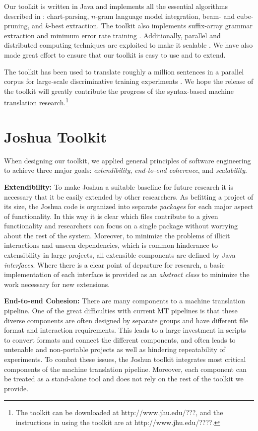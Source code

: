 \documentclass[11pt]{article}
\begin{document}
Our toolkit is written in Java and implements all the essential algorithms described in : chart-parsing, $n$-gram language model integration, beam- and cube-pruning, and $k$-best extraction.  The toolkit also implements suffix-array grammar extraction \cite{adam-suffix} and minimum error rate training \cite{discriminative-mert}. Additionally, parallel and distributed computing techniques are exploited to make it scalable \cite{zhifei-ssst08}. We have also made great effort to ensure that our toolkit is easy to use and to extend.

The toolkit has been used to translate roughly a million sentences in a parallel corpus for large-scale discriminative training experiments \cite{zhifei-amta08}.
We hope the release of the toolkit will greatly contribute the progress of the syntax-based machine translation research.\footnote{The toolkit can be downloaded at http://www.jhu.edu/???, and the instructions in using the toolkit are at http://www.jhu.edu/????.}



\section{Joshua Toolkit}
When designing our toolkit,  we applied general principles of software engineering to achieve three major goals: \emph{extendibility}, \emph{end-to-end coherence}, and \emph{scalability}.

\textbf{Extendibility:} To make Joshua a suitable baseline for future research it is necessary that it be easily extended by other researchers. As befitting a project of its size, the Joshua code is organized into separate \emph{packages} for each major aspect of functionality. In this way it is clear which files contribute to a given functionality and researchers can focus on a single package without worrying about the rest of the system. Moreover, to minimize the problems of illicit interactions and unseen dependencies, which is common hinderance to extensibility in large projects, all extensible components are defined by Java \emph{interfaces}. Where there is a clear point of departure for research, a basic implementation of each interface is provided as an \emph{abstract class} to minimize the work necessary for new extensions.

\textbf{End-to-end Cohesion:} There are many components to a machine translation pipeline. One of the great difficulties with current MT pipelines is that these diverse components are often designed by separate groups and have different file format and interaction requirements. This leads to a large investment in scripts to convert formats and connect the different components, and often leads to untenable and non-portable projects as well as hindering repeatability of experiments.
To combat these issues, the Joshua toolkit integrates most critical components of the machine translation pipeline. Moreover, each component can be treated as a stand-alone tool and does not rely on the rest of the toolkit we provide.
\end{document}

